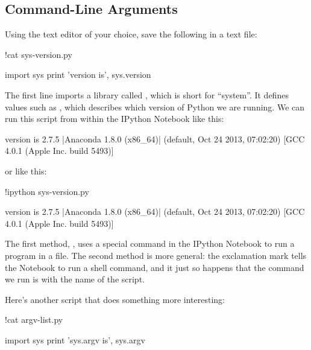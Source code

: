 \subsection{Command-Line Arguments}

Using the text editor of your choice, save the following in a text file:

\begin{VerbIn}
!cat sys-version.py
\end{VerbIn}

\begin{VerbIn}
import sys
print 'version is', sys.version
\end{VerbIn}

The first line imports a library called , which is short for
``system''. It defines values such as , which
describes which version of Python we are running. We can run this script
from within the IPython Notebook like this:

\begin{VerbIn}
\end{VerbIn}

\begin{VerbOut}
version is 2.7.5 |Anaconda 1.8.0 (x86_64)| (default, Oct 24 2013, 07:02:20)
[GCC 4.0.1 (Apple Inc. build 5493)]
\end{VerbOut}

or like this:

\begin{VerbIn}
!ipython sys-version.py
\end{VerbIn}

\begin{VerbOut}
version is 2.7.5 |Anaconda 1.8.0 (x86_64)| (default, Oct 24 2013, 07:02:20)
[GCC 4.0.1 (Apple Inc. build 5493)]
\end{VerbOut}

The first method, , uses a special command in the IPython
Notebook to run a program in a  file. The second method is
more general: the exclamation mark \code{!} tells the Notebook to run
a shell command, and it just so happens that the command we run is
 with the name of the script.

Here's another script that does something more interesting:

\begin{VerbIn}
!cat argv-list.py
\end{VerbIn}

\begin{VerbOut}
import sys
print 'sys.argv is', sys.argv
\end{VerbOut}

